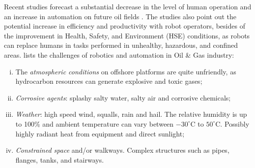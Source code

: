  

Recent studies forecast a substantial decrease in the level of human operation
and an increase in automation on future oil fields .
The studies also point out the potential increase
in efficiency and productivity with robot operators, besides of the improvement in
Health, Safety, and Environment (HSE) conditions, as robots can replace humans
in tasks performed in unhealthy, hazardous, and confined areas.
lists the challenges of robotics and automation in Oil
\& Gas industry:%

\begin{enumerate}[i)]
\item The \emph{atmospheric conditions} on offshore platforms are quite unfriendly, as
hydrocarbon resources can generate explosive and toxic gases;\\ %
\item \emph{Corrosive agents}: splashy salty water, salty air and corrosive chemicals;\\
\item \emph{Weather}: high speed wind, squalls, rain and hail. The relative humidity is up to
100\% and ambient temperature can vary between $-30^{\circ}$C to $50^{\circ}$C. Possibly highly radiant heat from equipment and direct sunlight;\\
\item \emph{Constrained space} and/or walkways. Complex structures such as pipes,
flanges, tanks, and stairways.
\end{enumerate}

